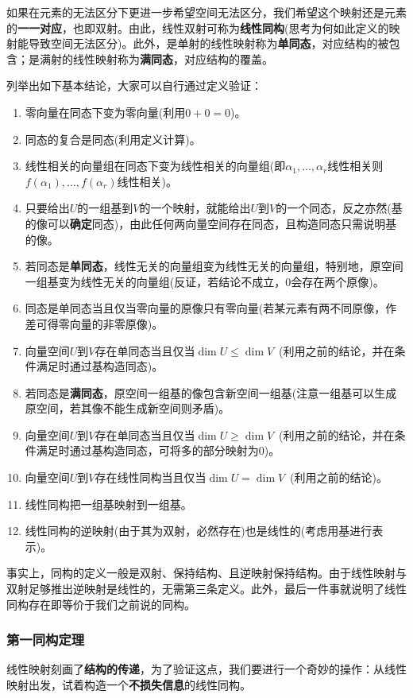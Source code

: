 \documentclass[a4paper,UTF8,fontset=windows]{ctexart}
\newcommand*{\note}{\noindent *}
\begin{document}
如果在元素的无法区分下更进一步希望空间无法区分，我们希望这个映射还是元素的\textbf{一一对应}，也即双射。由此，线性双射可称为\textbf{线性同构}(思考为何如此定义的映射能导致空间无法区分)。此外，是单射的线性映射称为\textbf{单同态}，对应结构的被包含；是满射的线性映射称为\textbf{满同态}，对应结构的覆盖。

列举出如下基本结论，大家可以自行通过定义验证：
\begin{enumerate}
    \item 零向量在同态下变为零向量(利用$0+0=0$)。
    \item 同态的复合是同态(利用定义计算)。
    \item 线性相关的向量组在同态下变为线性相关的向量组(即$\alpha_1,\dots,\alpha_r$线性相关则$f(\alpha_1),\dots,f(\alpha_r)$线性相关)。
    \item 只要给出$U$的一组基到$V$的一个映射，就能给出$U$到$V$的一个同态，反之亦然(基的像可以\textbf{确定}同态)，由此任何两向量空间存在同态，且构造同态只需说明基的像。
    \item 若同态是\textbf{单同态}，线性无关的向量组变为线性无关的向量组，特别地，原空间一组基变为线性无关的向量组(反证，若结论不成立，0会存在两个原像)。
    \item 同态是单同态当且仅当零向量的原像只有零向量(若某元素有两不同原像，作差可得零向量的非零原像)。
    \item 向量空间$U$到$V$存在单同态当且仅当$\dim U\le\dim V$\ (利用之前的结论，并在条件满足时通过基构造同态)。
    \item 若同态是\textbf{满同态}，原空间一组基的像包含新空间一组基(注意一组基可以生成原空间，若其像不能生成新空间则矛盾)。
    \item 向量空间$U$到$V$存在单同态当且仅当$\dim U\ge\dim V$\ (利用之前的结论，并在条件满足时通过基构造同态，可将多的部分映射为0)。
    \item 向量空间$U$到$V$存在线性同构当且仅当$\dim U=\dim V$\ (利用之前的结论)。
    \item 线性同构把一组基映射到一组基。
    \item 线性同构的逆映射(由于其为双射，必然存在)也是线性的(考虑用基进行表示)。
\end{enumerate}

\note 事实上，同构的定义一般是双射、保持结构、且逆映射保持结构。由于线性映射与双射足够推出逆映射是线性的，无需第三条定义。此外，最后一件事就说明了线性同构存在即等价于我们之前说的同构。

\subsubsection{第一同构定理}
线性映射刻画了\textbf{结构的传递}，为了验证这点，我们要进行一个奇妙的操作：从线性映射出发，试着构造一个\textbf{不损失信息}的线性同构。
\end{document}
